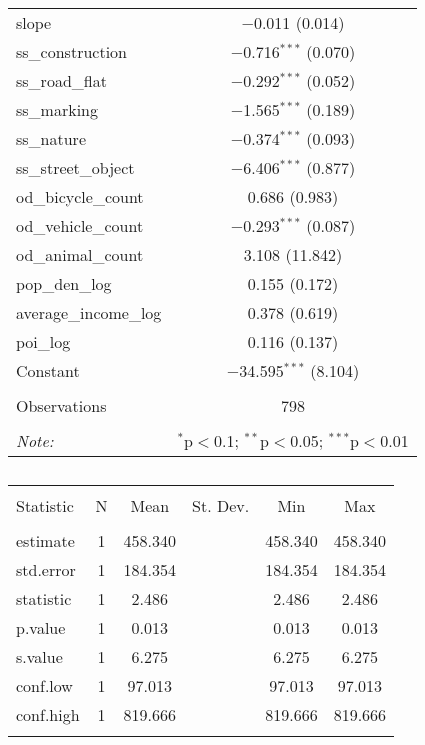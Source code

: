 \begin{table}[!htbp]
\begin{tabular}{@{\extracolsep{1pt}}lc}
  slope & $-$0.011 (0.014) \\ 
  ss\_construction & $-$0.716$^{***}$ (0.070) \\ 
  ss\_road\_flat & $-$0.292$^{***}$ (0.052) \\ 
  ss\_marking & $-$1.565$^{***}$ (0.189) \\ 
  ss\_nature & $-$0.374$^{***}$ (0.093) \\ 
  ss\_street\_object & $-$6.406$^{***}$ (0.877) \\ 
  od\_bicycle\_count & 0.686 (0.983) \\ 
  od\_vehicle\_count & $-$0.293$^{***}$ (0.087) \\ 
  od\_animal\_count & 3.108 (11.842) \\ 
  pop\_den\_log & 0.155 (0.172) \\ 
  average\_income\_log & 0.378 (0.619) \\ 
  poi\_log & 0.116 (0.137) \\ 
  Constant & $-$34.595$^{***}$ (8.104) \\ 
 \hline \\[-1.8ex] 
Observations & 798 \\ 
\hline 
\hline \\[-1.8ex] 
\textit{Note:}  & \multicolumn{1}{r}{$^{*}$p$<$0.1; $^{**}$p$<$0.05; $^{***}$p$<$0.01} \\ 
\end{tabular} 
\end{table} 

\begin{table}[!htbp] \centering 
  \caption{} 
  \label{} 
\small 
\begin{tabular}{@{\extracolsep{1pt}}lccccc} 
\\[-1.8ex]\hline 
\hline \\[-1.8ex] 
Statistic & \multicolumn{1}{c}{N} & \multicolumn{1}{c}{Mean} & \multicolumn{1}{c}{St. Dev.} & \multicolumn{1}{c}{Min} & \multicolumn{1}{c}{Max} \\ 
\hline \\[-1.8ex] 
estimate & 1 & 458.340 &  & 458.340 & 458.340 \\ 
std.error & 1 & 184.354 &  & 184.354 & 184.354 \\ 
statistic & 1 & 2.486 &  & 2.486 & 2.486 \\ 
p.value & 1 & 0.013 &  & 0.013 & 0.013 \\ 
s.value & 1 & 6.275 &  & 6.275 & 6.275 \\ 
conf.low & 1 & 97.013 &  & 97.013 & 97.013 \\ 
conf.high & 1 & 819.666 &  & 819.666 & 819.666 \\ 
\hline \\[-1.8ex] 
\end{tabular} 
\end{table} 

